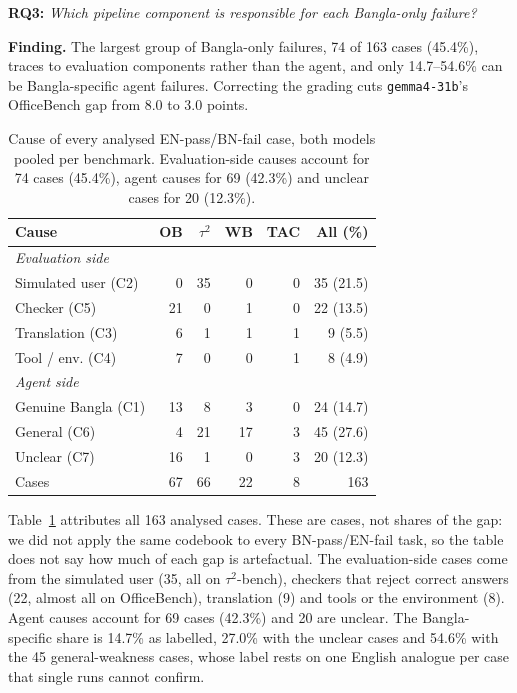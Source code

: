 \documentclass[11pt]{article}
\newcommand{\gemma}{\texttt{gemma4-31b}}
\newcommand{\OB}{OfficeBench}
\newcommand{\TAU}{$\tau^2$-bench}
\begin{document}
\noindent\textbf{RQ3:} \emph{Which pipeline component is responsible for each Bangla-only failure?}

\noindent\textbf{Finding.} The largest group of Bangla-only failures, 74 of 163 cases (45.4\%),
traces to evaluation components rather than the agent, and only 14.7--54.6\% can be
Bangla-specific agent failures. Correcting the grading cuts \gemma{}'s \OB{} gap from 8.0 to 3.0
points.

\begin{table}[t]
\centering\footnotesize
\setlength{\tabcolsep}{3pt}
\begin{tabular}{lrrrrr}
\toprule
Cause & OB & $\tau^2$ & WB & TAC & All (\%) \\
\midrule
\multicolumn{6}{l}{\emph{Evaluation side}} \\
Simulated user (C2) & 0 & 35 & 0 & 0 & 35 (21.5) \\
Checker (C5)        & 21 & 0 & 1 & 0 & 22 (13.5) \\
Translation (C3)    & 6 & 1 & 1 & 1 & 9 (5.5) \\
Tool / env. (C4)    & 7 & 0 & 0 & 1 & 8 (4.9) \\
\multicolumn{6}{l}{\emph{Agent side}} \\
Genuine Bangla (C1) & 13 & 8 & 3 & 0 & 24 (14.7) \\
General (C6)        & 4 & 21 & 17 & 3 & 45 (27.6) \\
Unclear (C7)        & 16 & 1 & 0 & 3 & 20 (12.3) \\
\midrule
Cases               & 67 & 66 & 22 & 8 & 163 \\
\bottomrule
\end{tabular}
\caption{Cause of every analysed EN-pass/BN-fail case, both models pooled per benchmark.
Evaluation-side causes account for 74 cases (45.4\%), agent causes for 69 (42.3\%) and unclear
cases for 20 (12.3\%).}
\label{tab:attribution}
\end{table}

Table~\ref{tab:attribution} attributes all 163 analysed cases. These are cases, not shares of the
gap: we did not apply the same codebook to every BN-pass/EN-fail task, so the table does not say
how much of each gap is artefactual. The evaluation-side cases come from the simulated user
(35, all on \TAU{}), checkers that reject correct answers (22,
almost all on \OB{}), translation (9) and tools or the environment (8). Agent causes account for
69 cases (42.3\%) and 20 are unclear. The Bangla-specific share is 14.7\% as labelled, 27.0\%
with the unclear cases and 54.6\% with the 45 general-weakness cases, whose label rests on one
English analogue per case that single runs cannot confirm.
\end{document}
